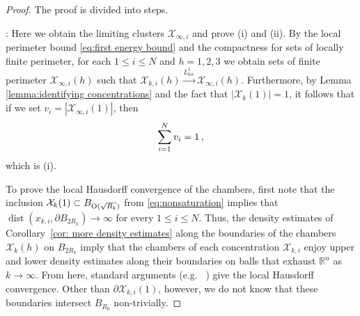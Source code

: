 \documentclass[10pt,reqno]{amsart}
\numberwithin{equation}{section}
\theoremstyle{definition}
\DeclareMathOperator{\dist}{dist}
\newcommand{\loc}{\mathrm{loc}}
\newcommand{\X}{\mathcal{X}}
\begin{document}
{\begin{proof}The proof is divided into steps.

\medskip

: Here we obtain the limiting clusters $\X_{\infty,i}$ and prove (i) and (ii). By the local perimeter bound \eqref{eq:first energy bound} and the compactness for sets of locally finite perimeter, for each $1\leq i \leq N$ and $h=1,2,3$ we obtain sets of finite perimeter $\X_{\infty,i}(h)$ such that $\X_{k,i}(h)\overset{L^1_\loc}{\to}\X_{\infty,i}(h)$. Furthermore, by Lemma \ref{lemma:identifying concentrations} and the fact that $|\X_k(1)|=1$, it follows that if we set $v_i=|\X_{\infty,i}(1)|$, then
\begin{align}\notag
    \sum_{i=1}^N v_i = 1\,,
\end{align}
which is (i).

To prove the local Hausdorff convergence of the chambers, first note that the inclusion $\X_k(1) \subset B_{{{\rm O}(\sqrt{R_k})}}$ from \eqref{eq:nonsaturation} implies that $\dist(x_{k,i},\partial B_{2R_k})\to \infty$ for every $1\leq i \leq N$. 
%
Thus, the  density estimates of Corollary~\ref{cor: more density estimates} along the boundaries of the chambers $\X_k(h)$ on $B_{2R_k}$ imply that the chambers of each concentration $\X_{k,i}$ enjoy {upper and lower} density estimates along their boundaries on balls that exhaust $\mathbb{R}^n$ as $k\to \infty$. 
From here, standard arguments (e.g.~ \cite[Proof of Theorem 21.14, Step 4]{Mag12}) give the local Hausdorff convergence. Other than $\partial \X_{k,i}(1)$, however, we do not know that these boundaries intersect $B_{R_0}$ non-trivially.

\medskip


\end{proof}}
\end{document}
